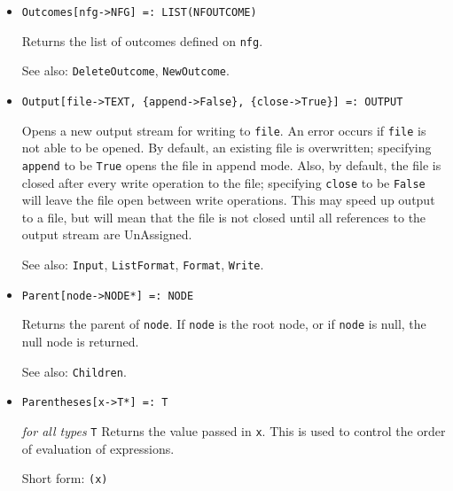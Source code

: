 \begin{itemize}
\item{}
\protect \large \begin{verbatim}
Outcomes[nfg->NFG] =: LIST(NFOUTCOME) 
\end{verbatim}\normalsize

\bd
Returns the list of outcomes defined on \verb+nfg+.
\item [See also:] \verb+DeleteOutcome+, \verb+NewOutcome+.
\ed

\item{}
\protect \large \begin{verbatim}
Output[file->TEXT, {append->False}, {close->True}] =: OUTPUT 
\end{verbatim}\normalsize

\bd

Opens a new output stream for writing to \verb+file+.  An error occurs
if \verb+file+ is not able to be opened.  By default, an existing file
is overwritten; specifying \verb+append+ to be \verb+True+ opens the
file in append mode.  Also, by default, the file is closed after every
write operation to the file; specifying \verb+close+ to be
\verb+False+ will leave the file open between write operations.  This
may speed up output to a file, but will mean that the file is not
closed until all references to the output stream are UnAssigned.

\item [See also:] \verb+Input+, \verb+ListFormat+, \verb+Format+,
\verb+Write+.
\ed


\item{}
\protect \large \begin{verbatim}
Parent[node->NODE*] =: NODE 
\end{verbatim}\normalsize

\bd
Returns the parent of \verb+node+.  If \verb+node+ is the root node,
or if \verb+node+ is null, the null node is returned.
\item [See also:] \verb+Children+.
\ed

\item{}
\protect \large \begin{verbatim}
Parentheses[x->T*] =: T 
\end{verbatim}\normalsize

{\it for all types} {\tt T}
\bd
Returns the value passed in \verb+x+.  This is used to control
the order of evaluation of expressions.
\item [Short form:] \verb+(x)+
\ed


\end{itemize}
